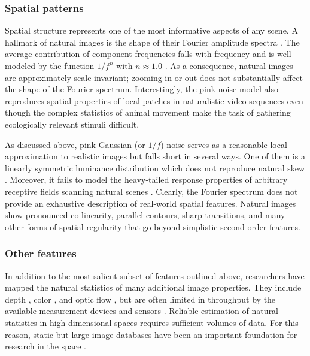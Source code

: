 \subsubsection{Spatial patterns}
Spatial structure represents one of the most informative aspects of any scene. A hallmark of natural images is the shape of their Fourier amplitude spectra \citep{Geisler:2008gu}. The average contribution of component frequencies falls with frequency and is well modeled by the function $1/f^n$ with $n\approx1.0$ \citep{Ruderman:1994ty,Field:1987ua,Dyakova:2015dy}. As a consequence, natural images are approximately scale-invariant; zooming in or out does not substantially affect the shape of the Fourier spectrum. Interestingly, the pink noise model also reproduces spatial properties of local patches in naturalistic video sequences \citep{Dong:1995aa} even though the complex statistics of animal movement make the task of gathering ecologically relevant stimuli difficult.

As discussed above, pink Gaussian (or $1/f$) noise serves as a reasonable local approximation to realistic images but falls short in several ways. One of them is a linearly symmetric luminance distribution which does not reproduce natural skew \citep{Geisler:2008gu}. Moreover, it fails to model the heavy-tailed response properties of arbitrary receptive fields scanning natural scenes \citep{Field:1987ua}. Clearly, the Fourier spectrum does not provide an exhaustive description of real-world spatial features. Natural images show pronounced co-linearity, parallel contours, sharp transitions, and many other forms of spatial regularity that go beyond simplistic second-order features.

\subsubsection{Other features}
In addition to the most salient subset of features outlined above, researchers have mapped the natural statistics of many additional image properties. They include depth \citep{Huang:2000aa}, color \citep{Ruderman:1998aa,Wachtler:2001aa}, and optic flow \citep{Roth:2005aa,Roth:2007bg}, but are often limited in throughput by the available measurement devices and sensors \citep{Geisler:2008gu}. Reliable estimation of natural statistics in high-dimensional spaces requires sufficient volumes of data. For this reason, static but large image databases have been an important foundation for research in the space \citep{vanHateren:1998jt}.

